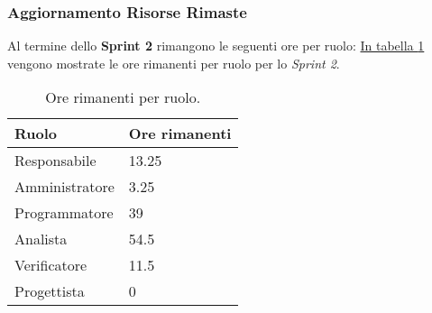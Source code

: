\subsubsection{Aggiornamento Risorse Rimaste}
Al termine dello \textbf{Sprint 2} rimangono le seguenti ore per ruolo: \hyperref[tab:sprint2_ore_rimanenti]{In tabella \ref{tab:sprint2_ore_rimanenti}} vengono mostrate le ore rimanenti per ruolo per lo \textit{Sprint 2}.

\begin{table}[H]
    \centering
    \begin{tabular}{| l | l |}
    \hline
    \textbf{Ruolo} & 
    \textbf{Ore rimanenti}\\
    \hline
        Responsabile & 13.25\\
    \hline
        Amministratore & 3.25\\
    \hline
        Programmatore & 39\\
    \hline
        Analista & 54.5\\
    \hline
        Verificatore & 11.5\\
    \hline
        Progettista & 0\\
    \hline
    \end{tabular}
    \caption{Ore rimanenti per ruolo.}
    \label{tab:sprint2_ore_rimanenti} 
\end{table}